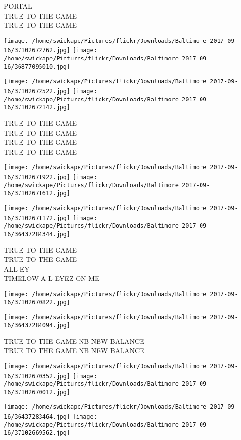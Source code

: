 \documentclass[10pt,letterpaper]{article}
\begin{document}
PORTAL\\
TRUE TO THE GAME\\
TRUE TO THE GAME
\pagebreak

\texttt{[image: /home/swickape/Pictures/flickr/Downloads/Baltimore 2017-09-16/37102672762.jpg]}
\texttt{[image: /home/swickape/Pictures/flickr/Downloads/Baltimore 2017-09-16/36877095010.jpg]}

\texttt{[image: /home/swickape/Pictures/flickr/Downloads/Baltimore 2017-09-16/37102672522.jpg]}
\texttt{[image: /home/swickape/Pictures/flickr/Downloads/Baltimore 2017-09-16/37102672142.jpg]}

TRUE TO THE GAME\\
TRUE TO THE GAME\\
TRUE TO THE GAME\\
TRUE TO THE GAME
\pagebreak

\texttt{[image: /home/swickape/Pictures/flickr/Downloads/Baltimore 2017-09-16/37102671922.jpg]}
\texttt{[image: /home/swickape/Pictures/flickr/Downloads/Baltimore 2017-09-16/37102671612.jpg]}

\texttt{[image: /home/swickape/Pictures/flickr/Downloads/Baltimore 2017-09-16/37102671172.jpg]}
\texttt{[image: /home/swickape/Pictures/flickr/Downloads/Baltimore 2017-09-16/36437284344.jpg]}

TRUE TO THE GAME\\
TRUE TO THE GAME\\
ALL EY\\
TIMELOW A L EYEZ ON ME
\pagebreak

\texttt{[image: /home/swickape/Pictures/flickr/Downloads/Baltimore 2017-09-16/37102670822.jpg]}

\vspace{0.25in}
\texttt{[image: /home/swickape/Pictures/flickr/Downloads/Baltimore 2017-09-16/36437284094.jpg]}

TRUE TO THE GAME NB NEW BALANCE\\
TRUE TO THE GAME NB NEW BALANCE
\pagebreak

\texttt{[image: /home/swickape/Pictures/flickr/Downloads/Baltimore 2017-09-16/37102670352.jpg]}
\texttt{[image: /home/swickape/Pictures/flickr/Downloads/Baltimore 2017-09-16/37102670012.jpg]}

\texttt{[image: /home/swickape/Pictures/flickr/Downloads/Baltimore 2017-09-16/36437283464.jpg]}
\texttt{[image: /home/swickape/Pictures/flickr/Downloads/Baltimore 2017-09-16/37102669562.jpg]}
\end{document}
